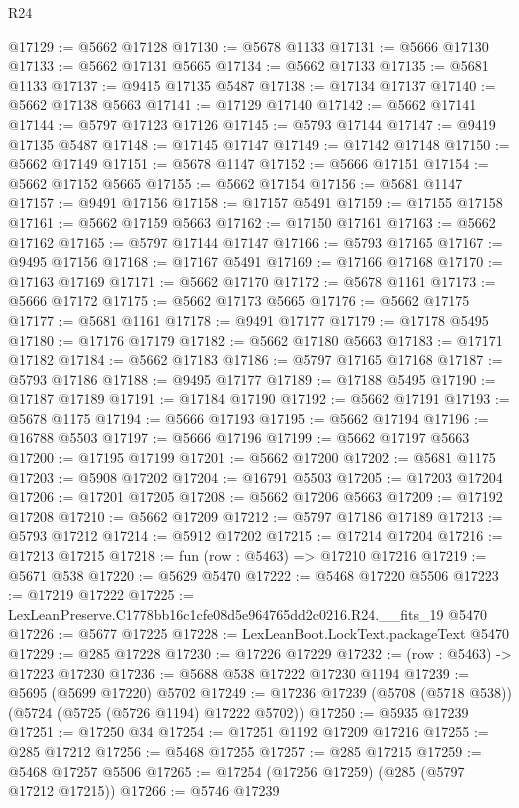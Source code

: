 \begin{lexlean}{R24}
\begin{coremodule}
@17129 := @5662 @17128
@17130 := @5678 @1133
@17131 := @5666 @17130
@17133 := @5662 @17131 @5665
@17134 := @5662 @17133
@17135 := @5681 @1133
@17137 := @9415 @17135 @5487
@17138 := @17134 @17137
@17140 := @5662 @17138 @5663
@17141 := @17129 @17140
@17142 := @5662 @17141
@17144 := @5797 @17123 @17126
@17145 := @5793 @17144
@17147 := @9419 @17135 @5487
@17148 := @17145 @17147
@17149 := @17142 @17148
@17150 := @5662 @17149
@17151 := @5678 @1147
@17152 := @5666 @17151
@17154 := @5662 @17152 @5665
@17155 := @5662 @17154
@17156 := @5681 @1147
@17157 := @9491 @17156
@17158 := @17157 @5491
@17159 := @17155 @17158
@17161 := @5662 @17159 @5663
@17162 := @17150 @17161
@17163 := @5662 @17162
@17165 := @5797 @17144 @17147
@17166 := @5793 @17165
@17167 := @9495 @17156
@17168 := @17167 @5491
@17169 := @17166 @17168
@17170 := @17163 @17169
@17171 := @5662 @17170
@17172 := @5678 @1161
@17173 := @5666 @17172
@17175 := @5662 @17173 @5665
@17176 := @5662 @17175
@17177 := @5681 @1161
@17178 := @9491 @17177
@17179 := @17178 @5495
@17180 := @17176 @17179
@17182 := @5662 @17180 @5663
@17183 := @17171 @17182
@17184 := @5662 @17183
@17186 := @5797 @17165 @17168
@17187 := @5793 @17186
@17188 := @9495 @17177
@17189 := @17188 @5495
@17190 := @17187 @17189
@17191 := @17184 @17190
@17192 := @5662 @17191
@17193 := @5678 @1175
@17194 := @5666 @17193
@17195 := @5662 @17194
@17196 := @16788 @5503
@17197 := @5666 @17196
@17199 := @5662 @17197 @5663
@17200 := @17195 @17199
@17201 := @5662 @17200
@17202 := @5681 @1175
@17203 := @5908 @17202
@17204 := @16791 @5503
@17205 := @17203 @17204
@17206 := @17201 @17205
@17208 := @5662 @17206 @5663
@17209 := @17192 @17208
@17210 := @5662 @17209
@17212 := @5797 @17186 @17189
@17213 := @5793 @17212
@17214 := @5912 @17202
@17215 := @17214 @17204
@17216 := @17213 @17215
@17218 := fun (row : @5463) => @17210 @17216
@17219 := @5671 @538
@17220 := @5629 @5470
@17222 := @5468 @17220 @5506
@17223 := @17219 @17222
@17225 := LexLeanPreserve.C1778bb16c1cfe08d5e964765dd2c0216.R24.__fits_19 @5470
@17226 := @5677 @17225
@17228 := LexLeanBoot.LockText.packageText @5470
@17229 := @285 @17228
@17230 := @17226 @17229
@17232 := (row : @5463) -> @17223 @17230
@17236 := @5688 @538 @17222 @17230 @1194
@17239 := @5695 (@5699 @17220) @5702
@17249 := @17236 @17239 (@5708 (@5718 @538)) (@5724 (@5725 (@5726 @1194) @17222 @5702))
@17250 := @5935 @17239
@17251 := @17250 @34
@17254 := @17251 @1192 @17209 @17216
@17255 := @285 @17212
@17256 := @5468 @17255
@17257 := @285 @17215
@17259 := @5468 @17257 @5506
@17265 := @17254 (@17256 @17259) (@285 (@5797 @17212 @17215))
@17266 := @5746 @17239

\end{coremodule}
\end{lexlean}
